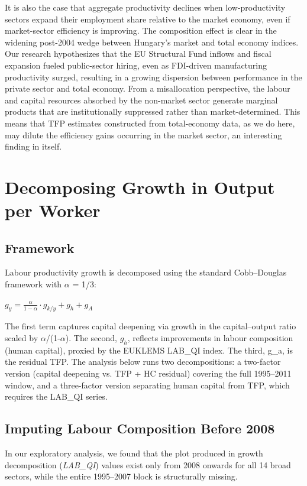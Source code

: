 \documentclass[11pt]{article}
\begin{document}
It is also the case that aggregate productivity declines when low-productivity sectors expand their employment share relative to the market economy, even if market-sector efficiency is improving. The composition effect is clear in the widening post-2004 wedge between Hungary’s market and total economy indices. Our research hypothesizes that the EU Structural Fund inflows and fiscal expansion fueled public-sector hiring, even as FDI-driven manufacturing productivity surged, resulting in a growing dispersion between performance in the private sector and total economy. From a misallocation perspective, the labour and capital resources absorbed by the non-market sector generate marginal products that are institutionally suppressed rather than market-determined. This means that TFP estimates constructed from total-economy data, as we do here, may dilute the efficiency gains occurring in the market sector, an interesting finding in itself.

\section{Decomposing Growth in Output per Worker}

\subsection{Framework}

Labour productivity growth is decomposed using the standard Cobb–Douglas framework with $\alpha$ = 1/3:

$g_y = \frac{\alpha}{1-\alpha} \cdot g_{k/y} + g_h + g_A$

The first term captures capital deepening via growth in the capital–output ratio scaled by $\alpha$/(1-$\alpha$). The second, $g_h$, reflects improvements in labour composition (human capital), proxied by the EUKLEMS LAB\_QI index. The third, g\_a, is the residual TFP. The analysis below runs two decompositions: a two-factor version (capital deepening vs. TFP + HC residual) covering the full 1995–2011 window, and a three-factor version separating human capital from TFP, which requires the LAB\_QI series.

\subsection{Imputing Labour Composition Before 2008}

In our exploratory analysis, we found that the plot produced in growth decomposition (\textit{LAB\_QI}) values exist only from 2008 onwards for all 14 broad sectors, while the entire 1995–2007 block is structurally missing.
\end{document}
